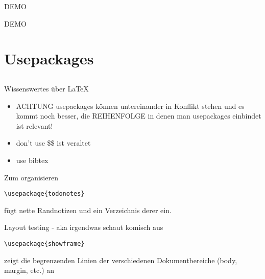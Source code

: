 \documentclass{beamer}
\begin{document}
\begin{frame}{DEMO}
    \begin{center}
        \Huge DEMO
    \end{center}
\end{frame}

\section{Usepackages}
\label{sec:usepackages}

\subsection{}
\begin{frame}{Wissenswertes über LaTeX}
    \begin{itemize}
        \item ACHTUNG usepackages können untereinander in Konflikt stehen und es kommt
              noch besser, die REIHENFOLGE in denen man usepackages einbindet ist
              relevant!
        \item  don't use \$\$ ist veraltet
        \item  use bibtex
    \end{itemize}
\end{frame}

\begin{frame}[fragile]{Zum organisieren}
    \footnotesize
    \begin{verbatim}
\usepackage{todonotes}
\end{verbatim}
    \normalsize
    fügt nette Randnotizen und ein Verzeichnis derer ein.
\end{frame}

\begin{frame}[fragile]{Layout testing - aka irgendwas schaut komisch aus}
    \footnotesize
    \begin{verbatim}
\usepackage{showframe}
    \end{verbatim}
    \normalsize
    zeigt die begrenzenden Linien der verschiedenen Dokumentbereiche (body,
    margin, etc.) an
\end{frame}
\end{document}
